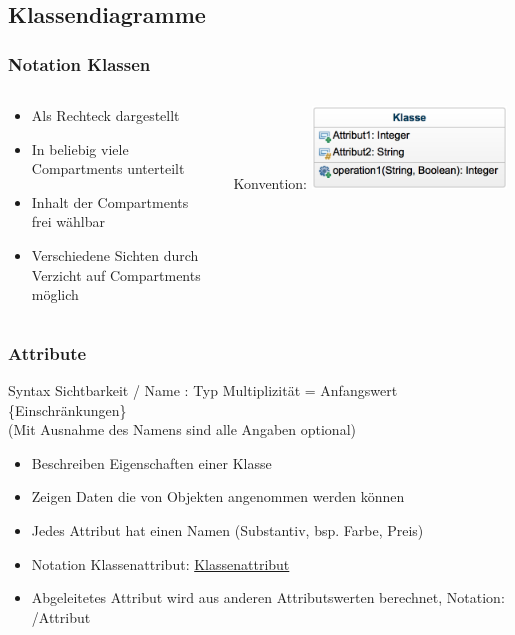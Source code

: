 \subsection{Klassendiagramme}
\begin{frame}
\frametitle{Notation Klassen}
\begin{columns}
	\begin{column}{.35\textwidth}
		\scriptsize
		\begin{itemize}
			\item Als Rechteck dargestellt
			\item In beliebig viele Compartments unterteilt
			\item Inhalt der Compartments frei wählbar
			\item Verschiedene Sichten durch Verzicht auf Compartments möglich
		\end{itemize}
		\normalsize
	\end{column}
	\begin{column}{.65\textwidth}
		Konvention:
		\center
		\includegraphics[width=0.7\textwidth,
		keepaspectratio=true]{bilder/klasse_notation.png}
	\end{column}
\end{columns}
\end{frame}

\begin{frame}
\frametitle{Attribute}
	\begin{block}{Syntax}
		Sichtbarkeit / Name : Typ Multiplizität = Anfangswert \{Einschränkungen\}
		\\
		(Mit Ausnahme des Namens sind alle Angaben optional)
	\end{block}
	\begin{itemize}
		\item Beschreiben Eigenschaften einer Klasse
		\item Zeigen Daten die von Objekten angenommen werden können
		\item Jedes Attribut hat einen Namen (Substantiv, bsp. Farbe, Preis)
	  \item Notation Klassenattribut: \uline{Klassenattribut}
		\item Abgeleitetes Attribut wird aus anderen Attributswerten berechnet, Notation: /Attribut
	\end{itemize}
\end{frame}

